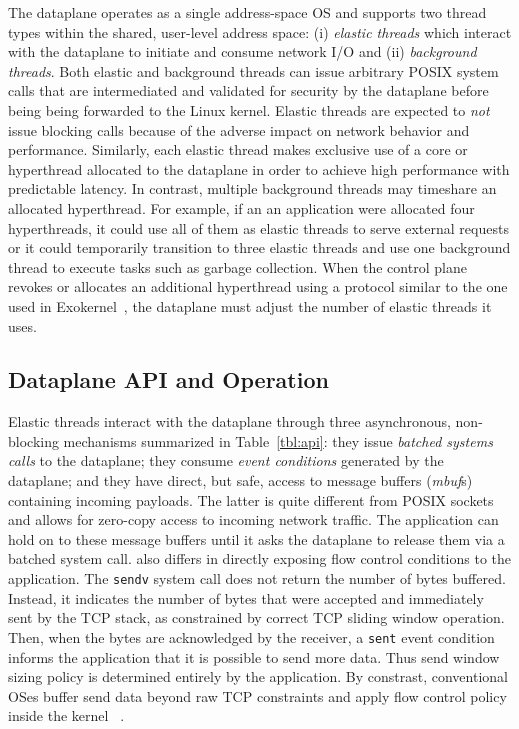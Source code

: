 The \ix dataplane operates as a single address-space OS and supports
two thread types within the shared, user-level address space: (i)
\emph{elastic threads} which interact with the \ix dataplane to
initiate and consume network I/O and (ii) \emph{background threads}.
Both elastic and background threads can issue arbitrary POSIX system
calls that are intermediated and validated for security by the
dataplane before being being forwarded to the Linux kernel.  Elastic
threads are expected to \emph{not} issue blocking calls because of the
adverse impact on network behavior and performance. Similarly, each
elastic thread makes exclusive use of a core or hyperthread allocated
to the dataplane in order to achieve high performance with predictable
latency. In contrast, multiple background threads may timeshare an
allocated hyperthread. For example, if an an application were
allocated four hyperthreads, it could use all of them as elastic
threads to serve external requests or it could temporarily transition
to three elastic threads and use one background thread to execute
tasks such as garbage collection. When the control plane revokes or
allocates an additional hyperthread using a protocol similar to the
one used in Exokernel~\cite{DBLP:conf/sosp/EnglerKO95}, the dataplane
must adjust the number of elastic threads it uses.


\subsection{Dataplane API and Operation}
\label{sec:impl:kernel}

Elastic threads interact with the \ix dataplane through three
asynchronous, non-blocking mechanisms summarized in
Table~\ref{tbl:api}: they issue \emph{batched systems calls} to the
dataplane; they consume \emph{event conditions} generated by the
dataplane; and they have direct, but safe, access to message buffers
(\emph{mbuf}s) containing incoming payloads.  The latter is quite
different from POSIX sockets and allows for zero-copy access to
incoming network traffic.  The application can hold on to these
message buffers until it asks the dataplane to release them via a
batched system call.  \ix also differs in directly exposing flow
control conditions to the application. The \texttt{sendv} system call
does not return the number of bytes buffered. Instead, it indicates
the number of bytes that were accepted and immediately sent by the TCP
stack, as constrained by correct TCP sliding window operation. Then,
when the bytes are acknowledged by the receiver, a \texttt{sent} event
condition informs the application that it is possible to send more
data. Thus send window sizing policy is determined entirely by the
application.  By constrast, conventional OSes buffer send data beyond
raw TCP constraints and apply flow control policy inside the kernel
~\cite{dynamicwindow}.

